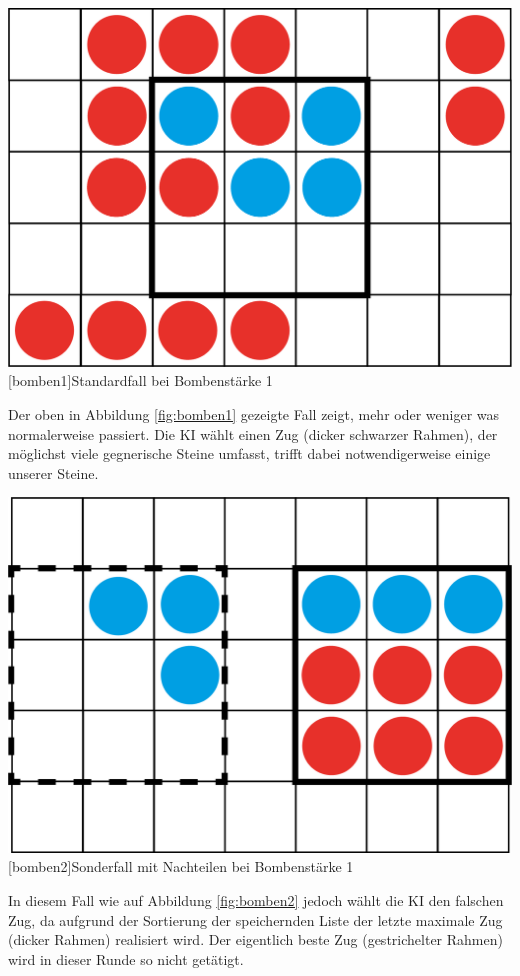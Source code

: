 \documentclass[12pt,a4paper,bibliography=totocnumbered,listof=totocnumbered]{scrartcl}
\begin{document}
	\vspace{1em}
	\begin{minipage}{\linewidth}
		\centering
		\includegraphics[width=0.6\linewidth]{pics/Kapitel_5/Kapitel_5_pic1.png}
		[bomben1]{\glqq Standardfall\grqq{} bei Bombenstärke 1}
		\label{fig:bomben1}
	\end{minipage}
	\vspace{1em}
	
	Der oben in Abbildung \ref{fig:bomben1} gezeigte Fall zeigt, mehr oder weniger was normalerweise passiert. Die KI wählt einen Zug (dicker schwarzer Rahmen), der möglichst viele gegnerische Steine umfasst, trifft dabei notwendigerweise einige unserer Steine.

	
	\vspace{1em}
	\begin{minipage}{\linewidth}
		\centering
		\includegraphics[width=0.6\linewidth]{pics/Kapitel_5/Kapitel_5_pic2.png}
		[bomben2]{Sonderfall mit Nachteilen bei Bombenstärke 1}
		\label{fig:bomben2}
	\end{minipage}
	\vspace{1em}
	
	In diesem Fall wie auf Abbildung \ref{fig:bomben2} jedoch wählt die KI den falschen Zug, da aufgrund der Sortierung der speichernden Liste der letzte maximale Zug (dicker Rahmen) realisiert wird. Der eigentlich beste Zug (gestrichelter Rahmen) wird in dieser Runde so nicht getätigt.
	
\end{document}
